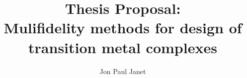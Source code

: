 \author{Jon Paul Janet}
\title{Thesis Proposal: \\ Mulifidelity methods for design of transition metal complexes}